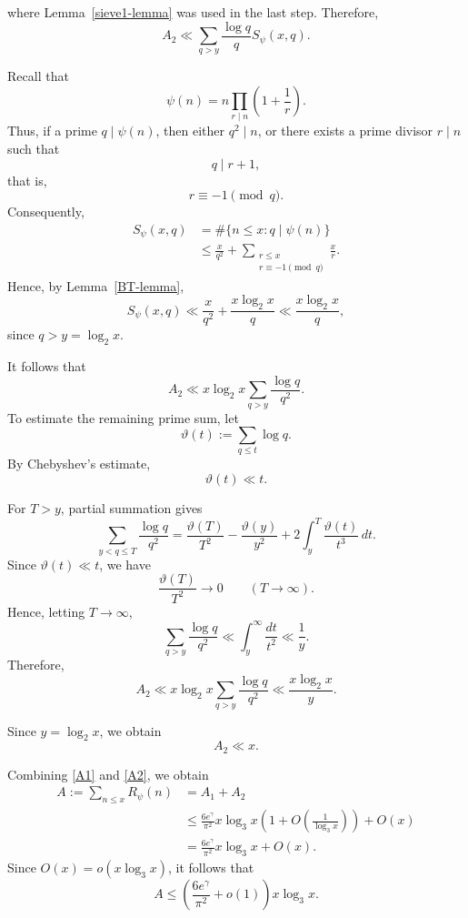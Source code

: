 \documentclass{article}
\theoremstyle{remark}
\begin{document}
where Lemma~\ref{sieve1-lemma} was used in the last step. Therefore,
\[
A_2
\ll
\sum_{q>y}\frac{\log q}{q}S_\psi(x,q).
\]

Recall that
\[
\psi(n)
=
n\prod_{r\mid n}\left(1+\frac1r\right).
\]
Thus, if a prime \(q\mid\psi(n)\), then either \(q^2\mid n\), or
there exists a prime divisor \(r\mid n\) such that
\[
q\mid r+1,
\]
that is,
\[
r\equiv-1\pmod q.
\]
Consequently,
\[
\begin{aligned}
S_\psi(x,q)
&=
\#\{n\le x:q\mid\psi(n)\}\\
&\le
\frac{x}{q^2}
+
\sum_{\substack{r\le x\\r\equiv-1\pmod q}}
\frac{x}{r}.
\end{aligned}
\]
Hence, by Lemma~\ref{BT-lemma},
\[
S_\psi(x,q)
\ll
\frac{x}{q^2}
+
\frac{x\log_2x}{q}
\ll
\frac{x\log_2x}{q},
\]
since \(q>y=\log_2x\).




It follows that
\[
A_2
\ll
x\log_2x
\sum_{q>y}\frac{\log q}{q^2}.
\]
To estimate the remaining prime sum, let
\[
\vartheta(t):=\sum_{q\le t}\log q.
\]
By Chebyshev's estimate,
\[
\vartheta(t)\ll t.
\]

For \(T>y\), partial summation gives
\[
\sum_{y<q\le T}\frac{\log q}{q^2}
=
\frac{\vartheta(T)}{T^2}
-\frac{\vartheta(y)}{y^2}
+
2\int_y^T\frac{\vartheta(t)}{t^3}\,dt.
\]
Since \(\vartheta(t)\ll t\), we have
\[
\frac{\vartheta(T)}{T^2}\to0
\qquad (T\to\infty).
\]
Hence, letting \(T\to\infty\),
\[
\sum_{q>y}\frac{\log q}{q^2}
\ll
\int_y^\infty\frac{dt}{t^2}
\ll
\frac1y.
\]
Therefore,
\[ A_2
\ll
x\log_2x
\sum_{q>y}\frac{\log q}{q^2}
\ll
\frac{x\log_2x}{y}.\]
   
Since \(y=\log_2x\), we obtain
\begin{equation}
A_2\ll x.\label{A2}
\end{equation}

Combining \eqref{A1} and \eqref{A2}, we obtain
\[
\begin{aligned}
A
:=\sum_{n\le x}R_\psi(n)
&=A_1+A_2\\
&\le
\frac{6e^\gamma}{\pi^2}
x\log_3x
\left(1+O\left(\frac1{\log_3x}\right)\right)
+O(x)\\
&=
\frac{6e^\gamma}{\pi^2}x\log_3x+O(x).
\end{aligned}
\]
Since \(O(x)=o(x\log_3x)\), it follows that
\begin{equation}\label{A}
{
A
\le
\left(\frac{6e^\gamma}{\pi^2}+o(1)\right)
x\log_3x.
}
\end{equation}
\end{document}
